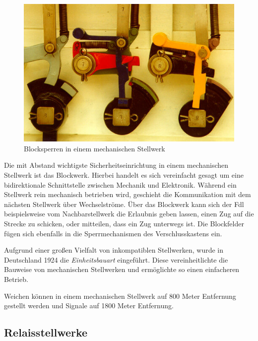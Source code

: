 \begin{figure}[H]
    \centering
    \includegraphics[width=.8\textwidth]{Assets/Images/2-Grundlagen/Mechanisches-Stellwerk-Blocksperren.jpg}
    \caption{Blocksperren in einem mechanischen Stellwerk~\cite{bib:stellwerke.de:Einheit}}\label{abb:Grundlagen:Stellwerkstechnik:Mechanische-Stellwerke:Blocksperren}
\end{figure}

Die mit Abstand wichtigste Sicherheitseinrichtung in einem mechanischen Stellwerk ist das Blockwerk. Hierbei handelt es sich vereinfacht gesagt um eine bidirektionale Schnittstelle zwischen Mechanik und Elektronik. Während ein Stellwerk rein mechanisch betrieben wird, geschieht die Kommunikation mit dem nächsten Stellwerk über Wechselströme. Über das Blockwerk kann sich der \ac{Fdl} beispielsweise vom Nachbarstellwerk die Erlaubnis geben lassen, einen Zug auf die Strecke zu schicken, oder mitteilen, dass ein Zug unterwegs ist. Die Blockfelder fügen sich ebenfalls in die Sperrmechanismen des Verschlusskastens ein.~\cite*[][S.179 ff.]{bib:Sicherung-des-Schienenverkehrs}

Aufgrund einer großen Vielfalt von inkompatiblen Stellwerken, wurde in Deutschland 1924 die \textit{Einheitsbauart} eingeführt. Diese vereinheitlichte die Bauweise von mechanischen Stellwerken und ermöglichte so einen einfacheren Betrieb.~\cite*[][S.173]{bib:Sicherung-des-Schienenverkehrs}

Weichen können in einem mechanischen Stellwerk auf 800 Meter Entfernung gestellt werden und Signale auf 1800 Meter Entfernung.~\cite{bib:DB:Stellwerke}

\subsection{Relaisstellwerke}\label{text:Grundlagen:Stellwerkstechnik:Relaisstellwerke}

